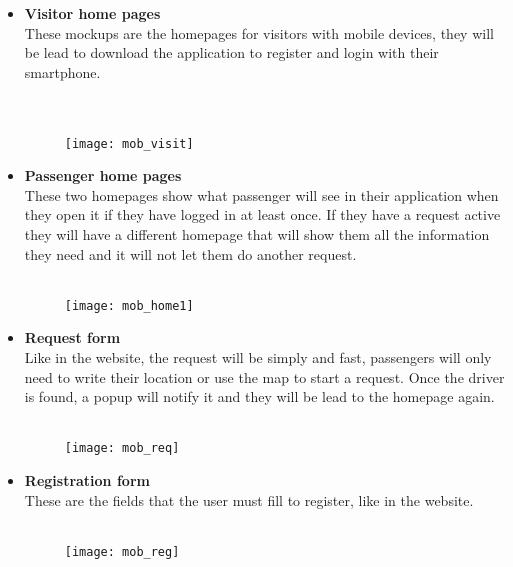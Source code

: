 \begin{itemize}
	\item \textbf{Visitor home pages}\\These mockups are the homepages for visitors with mobile devices, they will be lead to download the application to register and login with their smartphone.\\     \\ \\ 
	\begin{figure}[h]
		\centering	
		\texttt{[image: mob\_visit]}
	\end{figure}
	\newpage
	
\item \textbf{Passenger home pages} \\ These two homepages show what passenger will see in their application when they open it if they have logged in at least once. If they have a request active they will have a different homepage that will show them all the information they need and it will not let them do another request.
\\ \\ 
\begin{figure}[h]
	\centering	
	\texttt{[image: mob\_home1]}
\end{figure}
\newpage

\item \textbf{Request form} \\ Like in the website, the request will be simply and fast, passengers will only need to write their location or use the map to start a request. Once the driver is found, a popup will notify it and they will be lead to the homepage again. \\ \\
\begin{figure}[h]
	\centering	
	\texttt{[image: mob\_req]}
\end{figure}
\newpage



\item \textbf{Registration form} \\ These are the fields that the user must fill to register, like in the website.
\\ \\ 
\begin{figure}[h]
	\centering	
	\texttt{[image: mob\_reg]}
\end{figure}
\newpage


\end{itemize}
